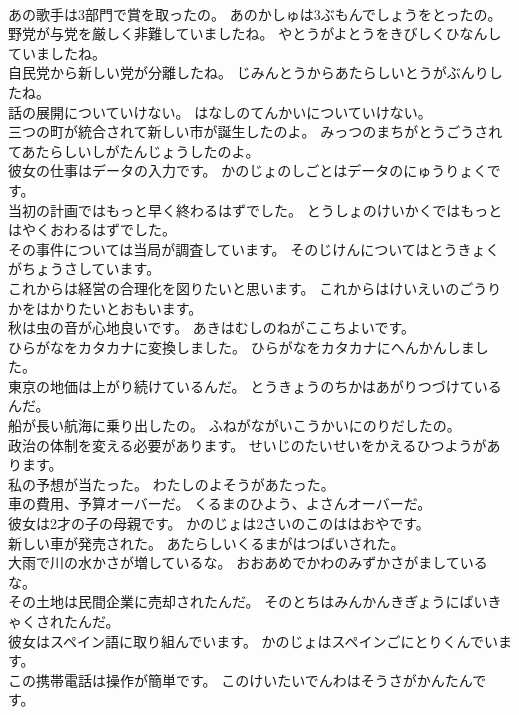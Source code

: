 \documentclass[8pt]{extreport}
\begin{document}
\begin{CJK}{UTF8}{min}
\\	あの歌手は3部門で賞を取ったの。	あのかしゅは3ぶもんでしょうをとったの。 
\\	野党が与党を厳しく非難していましたね。	やとうがよとうをきびしくひなんしていましたね。 
\\	自民党から新しい党が分離したね。	じみんとうからあたらしいとうがぶんりしたね。 
\\	話の展開についていけない。	はなしのてんかいについていけない。 
\\	三つの町が統合されて新しい市が誕生したのよ。	みっつのまちがとうごうされてあたらしいしがたんじょうしたのよ。 
\\	彼女の仕事はデータの入力です。	かのじょのしごとはデータのにゅうりょくです。 
\\	当初の計画ではもっと早く終わるはずでした。	とうしょのけいかくではもっとはやくおわるはずでした。 
\\	その事件については当局が調査しています。	そのじけんについてはとうきょくがちょうさしています。 
\\	これからは経営の合理化を図りたいと思います。	これからはけいえいのごうりかをはかりたいとおもいます。 
\\	秋は虫の音が心地良いです。	あきはむしのねがここちよいです。 
\\	ひらがなをカタカナに変換しました。	ひらがなをカタカナにへんかんしました。 
\\	東京の地価は上がり続けているんだ。	とうきょうのちかはあがりつづけているんだ。 
\\	船が長い航海に乗り出したの。	ふねがながいこうかいにのりだしたの。 
\\	政治の体制を変える必要があります。	せいじのたいせいをかえるひつようがあります。 
\\	私の予想が当たった。	わたしのよそうがあたった。 
\\	車の費用、予算オーバーだ。	くるまのひよう、よさんオーバーだ。 
\\	彼女は2才の子の母親です。	かのじょは2さいのこのははおやです。 
\\	新しい車が発売された。	あたらしいくるまがはつばいされた。 
\\	大雨で川の水かさが増しているな。	おおあめでかわのみずかさがましているな。 
\\	その土地は民間企業に売却されたんだ。	そのとちはみんかんきぎょうにばいきゃくされたんだ。 
\\	彼女はスペイン語に取り組んでいます。	かのじょはスペインごにとりくんでいます。 
\\	この携帯電話は操作が簡単です。	このけいたいでんわはそうさがかんたんです。 

\end{CJK}
\end{document}
